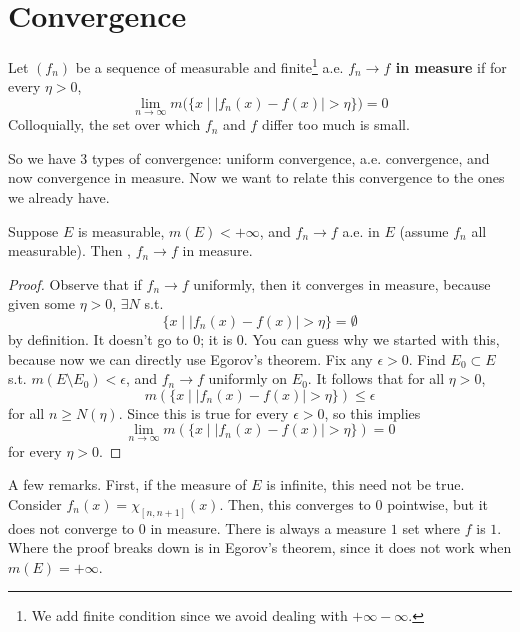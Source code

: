 \section{Convergence} 

  \begin{definition}
    Let $(f_n)$ be a sequence of measurable and finite\footnote{We add finite condition since we avoid dealing with $+\infty - \infty$.} a.e. \textbf{$f_n \to f$ in measure} if for every $\eta > 0$, 
    \begin{equation}
      \lim_{n \to \infty} m \big( \{x \mid |f_n (x) - f(x)|  > \eta \}\big) = 0
    \end{equation}
    Colloquially, the set over which $f_n$ and $f$ differ too much is small. 
  \end{definition}

  So we have 3 types of convergence: uniform convergence, a.e. convergence, and now convergence in measure. Now we want to relate this convergence to the ones we already have. 

  \begin{theorem}
    Suppose $E$ is measurable, $m(E) < +\infty$, and $f_n \to f$ a.e. in $E$ (assume $f_n$ all measurable). Then , $f_n \to f$ in measure. 
  \end{theorem}
  \begin{proof}
    Observe that if $f_n \to f$ uniformly, then it converges in measure, because given some $\eta > 0$, $\exists N$ s.t. 
    \begin{equation}
      \{ x \mid |f_n (x) - f(x) | > \eta \} = \emptyset
    \end{equation}
    by definition. It doesn't go to $0$; it is $0$. You can guess why we started with this, because now we can directly use Egorov's theorem. Fix any $\epsilon > 0$. Find $E_0 \subset E$ s.t. $m (E \setminus E_0) < \epsilon$, and $f_n \to f$ uniformly on $E_0$. It follows that for all $\eta > 0$, 
    \begin{equation}
      m(\{x \mid |f_n (x) - f(x)| > \eta\}) \leq \epsilon 
    \end{equation}
    for all $n \geq N(\eta)$. Since this is true for every $\epsilon > 0$, so this implies
    \begin{equation}
      \lim_{n \to \infty} m(\{ x \mid |f_n (x) - f(x)| > \eta\}) = 0
    \end{equation} 
    for every $\eta > 0$. 
  \end{proof}

  A few remarks. First, if the measure of $E$ is infinite, this need not be true. Consider $f_n (x) = \chi_{[n, n+1]} (x)$. Then, this converges to $0$ pointwise, but it does not converge to $0$ in measure. There is always a measure $1$ set where $f$ is $1$. Where the proof breaks down is in Egorov's theorem, since it does not work when $m(E) = +\infty$. 


